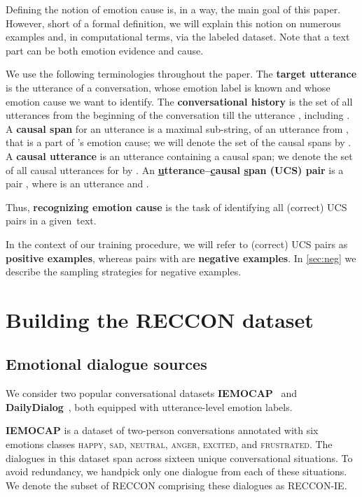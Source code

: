\documentclass[11pt,a4paper]{article}
\theoremstyle{definition}
\newcommand\emo[1]{\textsc{#1}}
\newcommand\RECCONDA{RECCON}
\newcommand\RECCONDAIE{RECCON-IE}
\begin{document}
Defining the notion of emotion cause is, in a way, the main goal of this paper. However, short of a formal definition, we will explain this notion on numerous examples and, in computational terms, via the labeled dataset. Note that a text part can be both emotion evidence and cause.

We use the following terminologies throughout the paper. 
The \textbf{target utterance}  is the  utterance of a conversation, whose emotion label  is known and whose emotion cause we want to identify.
The \textbf{conversational history}  is the set of all utterances from the beginning of the conversation till the utterance , including .
A \textbf{causal span} for an utterance  is a maximal sub-string, of an utterance from , that is a part of 's emotion cause; we will denote the set of the causal spans by .
A \textbf{causal utterance} is an utterance containing a causal span; we denote the set of all causal utterances for  by .
An \textbf{\underline utterance--\underline causal \underline span (UCS) pair} is a pair , where  is an utterance and .

Thus, \textbf{recognizing emotion cause} is the task of identifying all (correct) UCS pairs in a given~text.

In the context of our training procedure, we will refer to (correct) UCS pairs as \textbf{positive 
examples}, whereas pairs  with  are  \textbf{negative
examples}.
In \cref{sec:neg} we describe the sampling strategies for negative examples.







\section{Building the \RECCONDA{} dataset}\label{sec:dataset}

\subsection{Emotional dialogue sources}
We consider two popular conversational datasets \textbf{IEMOCAP}~\cite{iemocap} and \textbf{DailyDialog}~\cite{li2017dailydialog}, both equipped with utterance-level emotion labels.



\textbf{IEMOCAP} is a dataset of two-person conversations annotated with six emotions classes \emo{happy}, \emo{sad}, \emo{neutral}, \emo{anger}, \emo{excited}, and \emo{frustrated}. The dialogues in this dataset span across sixteen unique conversational situations. To avoid redundancy, we handpick only one dialogue from each of these situations. We denote the subset of \RECCONDA{} comprising these dialogues as \RECCONDAIE{}.
\end{document}
